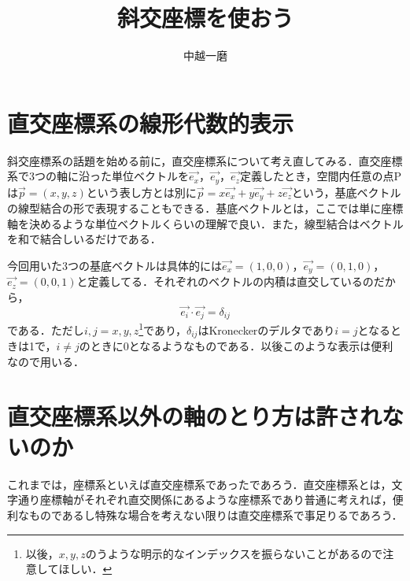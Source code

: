 \documentclass[dvipdfmx,a4]{jsarticle}
\title{斜交座標を使おう}
\author{中越一磨}
\begin{document}
\maketitle

\section{直交座標系の線形代数的表示}
斜交座標系の話題を始める前に，直交座標系について考え直してみる．直交座標系で3つの軸に沿った単位ベクトルを\(\vec{e_x}\)，\(\vec{e_y}\)，\(\vec{e_z}\)定義したとき，空間内任意の点Pは\(\vec{p}=(x,y,z)\)という表し方とは別に\(\vec{p}=x\vec{e_x} + y\vec{e_y} +z\vec{e_z}\)という，基底ベクトルの線型結合の形で表現することもできる．基底ベクトルとは，ここでは単に座標軸を決めるような単位ベクトルくらいの理解で良い．また，線型結合はベクトルを和で結合しいるだけである．

今回用いた3つの基底ベクトルは具体的には\(\vec{e_x}=(1,0,0)\)，\(\vec{e_y}=(0,1,0)\)，\(\vec{e_z}=(0,0,1)\)と定義してる．それぞれのベクトルの内積は直交しているのだから，
\begin{equation*}
  \vec{e_i}\cdot \vec{e_j} = \delta_{ij}
\end{equation*}
である．ただし\(i,j=x,y,z\)\footnote{以後，\(x,y,z\)のうような明示的なインデックスを振らないことがあるので注意してほしい．}であり，\(\delta_{ij}\)はKroneckerのデルタであり\(i=j\)となるときは1で，\(i\not =j\)のときに0となるようなものである．以後このような表示は便利なので用いる．

\section{直交座標系以外の軸のとり方は許されないのか}
これまでは，座標系といえば直交座標系であったであろう．直交座標系とは，文字通り座標軸がそれぞれ直交関係にあるような座標系であり普通に考えれば，便利なものであるし特殊な場合を考えない限りは直交座標系で事足りるであろう．
\end{document}

